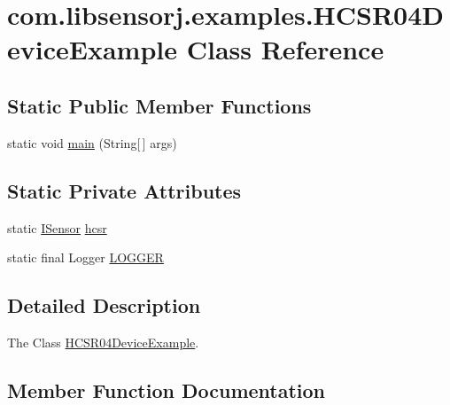 \hypertarget{classcom_1_1libsensorj_1_1examples_1_1HCSR04DeviceExample}{}\section{com.\+libsensorj.\+examples.\+H\+C\+S\+R04\+Device\+Example Class Reference}
\label{classcom_1_1libsensorj_1_1examples_1_1HCSR04DeviceExample}
\subsection*{Static Public Member Functions}
\begin{DoxyCompactItemize}
\item 
static void \hyperlink{classcom_1_1libsensorj_1_1examples_1_1HCSR04DeviceExample_ab213367036bb78e1b6614967207a718a}{main} (String\mbox{[}$\,$\mbox{]} args)
\end{DoxyCompactItemize}
\subsection*{Static Private Attributes}
\begin{DoxyCompactItemize}
\item 
static \hyperlink{interfacecom_1_1libsensorj_1_1interfaces_1_1ISensor}{I\+Sensor} \hyperlink{classcom_1_1libsensorj_1_1examples_1_1HCSR04DeviceExample_aa4f457230d5989c781e4c142492cf9c2}{hcsr}
\item 
static final Logger \hyperlink{classcom_1_1libsensorj_1_1examples_1_1HCSR04DeviceExample_a156f69717cfae755de776e6310ae212f}{L\+O\+G\+G\+E\+R}
\end{DoxyCompactItemize}


\subsection{Detailed Description}
The Class \hyperlink{classcom_1_1libsensorj_1_1examples_1_1HCSR04DeviceExample}{H\+C\+S\+R04\+Device\+Example}. 

\subsection{Member Function Documentation}
\hypertarget{classcom_1_1libsensorj_1_1examples_1_1HCSR04DeviceExample_ab213367036bb78e1b6614967207a718a}{}
